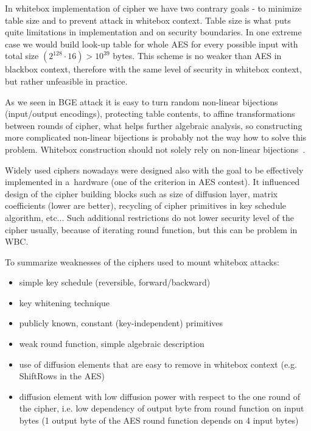 \documentclass[11pt,oneside,final]{fithesis2}
\begin{document}
    In whitebox implementation of cipher we have two contrary goals - to minimize table size and to prevent attack in whitebox context. Table size is what puts quite limitations
    in implementation and on security boundaries. In one extreme case we would build look-up table for whole AES for every possible input with total size 
    $\left(2^{128} \cdot 16\right) > 10^{39}$ bytes. This 
    scheme is no weaker than AES in blackbox context, therefore with the same level of security in whitebox context, but rather unfeasible in practice.

    As we seen in BGE attack it is easy to turn random non-linear bijections (input/output encodings), protecting table contents, to affine transformations between rounds of
    cipher, what helps further algebraic analysis, so constructing more complicated non-linear bijections is probably not the way how to solve this problem. Whitebox construction
    should not solely rely on non-linear bijections~\citep{Billet:2004:CWB:2080787.2080809, Michiels:2007:MST:1314276.1314291}.
    
    Widely used ciphers nowadays were designed also with the goal to be effectively implemented in a~hardware (one of the criterion in AES contest). 
    It influenced design of the cipher building blocks such as
    size of diffusion layer, matrix coefficients (lower are better), recycling of cipher primitives in key schedule algorithm, etc...
    Such additional restrictions do not lower security level of the cipher usually, because of iterating round function, but this can be problem in WBC.
    
    To summarize weaknesses of the ciphers used to mount whitebox attacks:
    \begin{itemize}
     \item simple key schedule (reversible, forward/backward)
     \item key whitening technique
     \item publicly known, constant (key-independent) primitives
     \item weak round function, simple algebraic description
     \item use of diffusion elements that are easy to remove in whitebox context (e.g. ShiftRows in the AES)
     \item diffusion element with low diffusion power with respect to the one round of the cipher, i.e. low dependency of 
	    output byte from round function on input bytes (1 output byte of the AES round function depends on 4 input bytes)
    \end{itemize}
    
\end{document}
